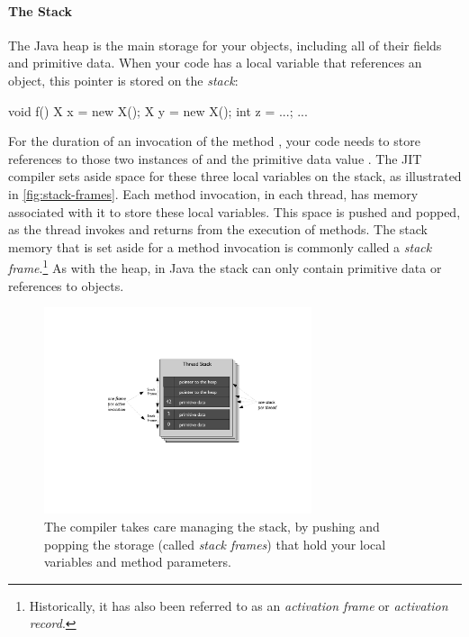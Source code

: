 \paragraph{The Stack}
The Java heap is the main storage for your objects, including all of their
fields and primitive data. When your code has a local variable that references
an object, this pointer is stored on the \emph{stack}:
\begin{shortlisting}
void f() {
   X x = new X();
   X y = new X();
   int z = ...;
   ...
}
\end{shortlisting}
For the duration of an invocation of the method , your code needs to
store references to those two instances of  and
the primitive data value . The JIT compiler
sets aside space for these three local variables on
the stack, as illustrated in \autoref{fig:stack-frames}.   Each method
invocation, in each thread, has memory associated with it to store these local
variables. This space is pushed and popped,
as the thread invokes and returns from the execution of methods. The stack
memory that is set aside for a method invocation is commonly called a
\emph{stack frame}.\footnote{Historically, it has also been
referred to as an \emph{activation frame} or \emph{activation record}.} As with the heap, in Java the stack can only
contain primitive data or references to objects.

\begin{figure}
\centering
\includegraphics[width=0.7\textwidth]{part2/Figures/lifetime/heaps_and_stacks_stack_frames}
\caption{The compiler takes care managing the stack, by pushing and popping
the storage (called \emph{stack frames}) that hold your local variables and
method parameters.}
\label{fig:stack-frames}
\end{figure}

